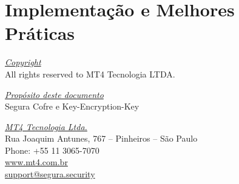 \documentclass{article}
\begin{document}
\pagebreak

\section{Implementação e Melhores Práticas}


\vspace*{\fill}
\begin{flushright}
	\underline{\textit{Copyright}}\\
	All rights reserved to MT4 Tecnologia LTDA.\bigskip

	\underline{\textit{Propósito deste documento}}\\
	Segura Cofre e Key-Encryption-Key\bigskip
	
	\underline{\textit{MT4 Tecnologia Ltda.}}\\
	Rua Joaquim Antunes, 767 – Pinheiros – São Paulo\\
	Phone: +55 11 3065-7070\\
	\url{www.mt4.com.br}\\
	\href{mailto:support@segura.security}{support@segura.security}\\
\end{flushright}
\end{document}
